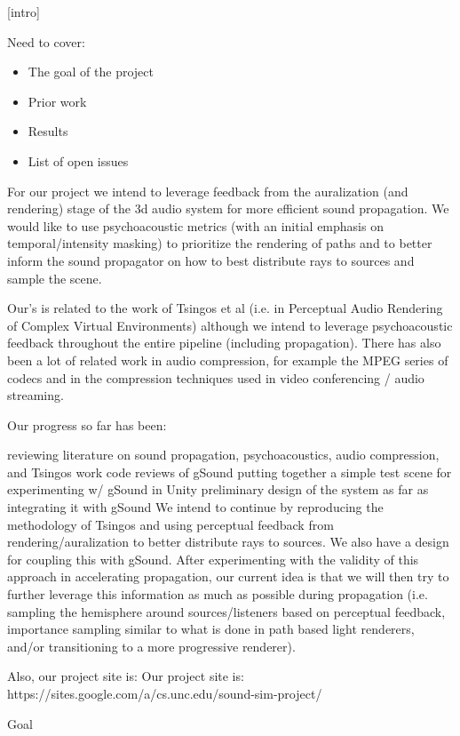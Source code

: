 [intro]

Need to cover:
\begin{itemize}
\item The goal of the project
\item Prior work
\item Results 
\item List of open issues 
\end{itemize}



For our project we intend to leverage feedback from the auralization (and rendering) stage of the 3d audio system for more efficient sound propagation. We would like to use psychoacoustic metrics (with an initial emphasis on temporal/intensity masking) to prioritize the rendering of paths and to better inform the sound propagator on how to best distribute rays to sources and sample the scene.

Our's is related to the work of Tsingos et al (i.e. in Perceptual Audio Rendering of Complex Virtual Environments) although we intend to leverage psychoacoustic feedback throughout the entire pipeline (including propagation). There has also been a lot of related work in audio compression, for example the MPEG series of codecs and in the compression techniques used in video conferencing / audio streaming.

Our progress so far has been:

 reviewing literature on sound propagation, psychoacoustics, audio compression, and Tsingos work 
code reviews of gSound
putting together a simple test scene for experimenting w/ gSound in Unity
preliminary design of the system as far as integrating it with gSound
We intend to continue by reproducing the methodology of Tsingos and using perceptual feedback from rendering/auralization to better distribute rays to sources. We also have a design for coupling this with gSound. After experimenting with the validity of this approach in accelerating propagation, our current idea is that we will then try to further leverage this information as much as possible during propagation (i.e. sampling the hemisphere around sources/listeners based on perceptual feedback, importance sampling similar to what is done in path based light renderers, and/or transitioning to a more progressive renderer).

Also, our project site is: Our project site is: https://sites.google.com/a/cs.unc.edu/sound-sim-project/



Goal

